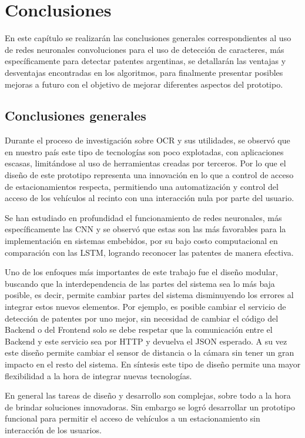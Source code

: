 \chapter{Conclusiones}
En este capítulo se realizarán las conclusiones generales correspondientes al uso de redes neuronales convoluciones para el uso de detección de caracteres, más específicamente para detectar patentes argentinas, se detallarán las ventajas y desventajas encontradas en los algoritmos, para finalmente presentar posibles mejoras a futuro con el objetivo de mejorar diferentes aspectos del prototipo.

\section{Conclusiones generales}

Durante el proceso de investigación sobre OCR y sus utilidades, se observó que en nuestro país este tipo de tecnologías son poco explotadas, con aplicaciones escasas, limitándose al uso de herramientas creadas por terceros.
Por lo que el diseño de este prototipo representa una innovación en lo que a control de acceso de estacionamientos respecta, permitiendo una automatización y control del acceso de los vehículos al recinto con una interacción nula por parte del usuario.

Se han estudiado en profundidad el funcionamiento de redes neuronales, más específicamente las CNN y se observó que estas son las más favorables para la implementación en sistemas embebidos, por su bajo costo computacional en comparación con las LSTM, logrando reconocer las patentes de manera efectiva.

Uno de los enfoques más importantes de este trabajo fue el diseño modular, buscando que la interdependencia de las partes del sistema sea lo más baja posible, es decir, permite cambiar partes del sistema disminuyendo los errores al integrar estos nuevos elementos.
Por ejemplo, es posible cambiar el servicio de detección de patentes por uno mejor, sin necesidad de cambiar el código del Backend o del Frontend solo se debe respetar que la comunicación entre el Backend y este servicio sea por HTTP y devuelva el JSON esperado.
A su vez este diseño permite cambiar el sensor de distancia o la cámara sin tener un gran impacto en el resto del sistema.
En síntesis este tipo de diseño permite una mayor flexibilidad a la hora de integrar nuevas tecnologías.

En general las tareas de diseño y desarrollo son complejas, sobre todo a la hora de brindar soluciones innovadoras.
Sin embargo se logró desarrollar un prototipo funcional para permitir el acceso de vehículos a un estacionamiento sin interacción de los usuarios.

